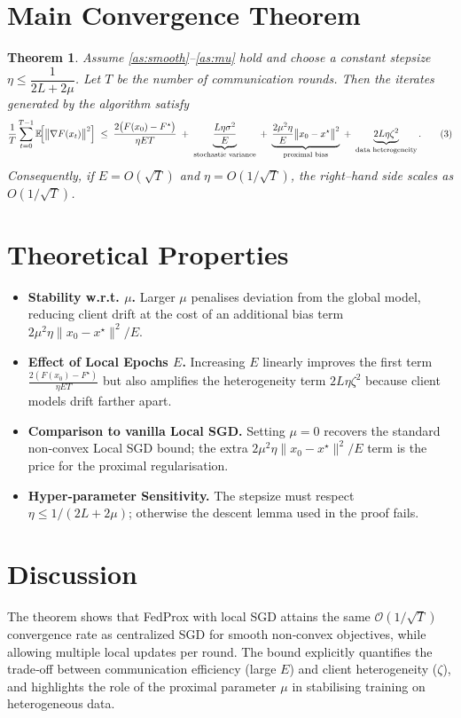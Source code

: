 \documentclass{article}
\newtheorem{theorem}{Theorem}
\newcommand{\E}{\mathbb{E}}
\begin{document}
\section*{Main Convergence Theorem}
\begin{theorem}\label{thm:main}
Assume \ref{as:smooth}–\ref{as:mu} hold and choose a constant stepsize 
$\eta\le \dfrac{1}{2L+2\mu}$.  
Let $T$ be the number of communication rounds.  
Then the iterates generated by the algorithm satisfy
\[
\frac1T\sum_{t=0}^{T-1}
\E\!\Bigl[\bigl\|\nabla F(x_t)\bigr\|^{2}\Bigr]
\;\le\;
\frac{2\bigl(F(x_0)-F^{\star}\bigr)}{\eta ET}
\;+\;
\underbrace{ \frac{L\eta\sigma^{2}}{E} }_{\text{stochastic variance}}
\;+\;
\underbrace{ \frac{2\mu^{2}\eta}{E}\bigl\|x_0-x^{\star}\bigr\|^{2} }_{\text{proximal bias}}
\;+\;
\underbrace{ 2L\eta\zeta^{2} }_{\text{data heterogeneity}} .
\tag{3}
\]
Consequently, if $E=O(\sqrt{T})$ and $\eta=O(1/\sqrt{T})$, the right–hand side scales as $O(1/\sqrt{T})$.
\end{theorem}

\section*{Theoretical Properties}
\begin{itemize}
\item \textbf{Stability w.r.t. $\mu$.} Larger $\mu$ penalises deviation from the global model, reducing client drift at the cost of an additional bias term $2\mu^{2}\eta\|x_0-x^{\star}\|^{2}/E$.
\item \textbf{Effect of Local Epochs $E$.} Increasing $E$ linearly improves the first term $\frac{2(F(x_0)-F^{\star})}{\eta ET}$ but also amplifies the heterogeneity term $2L\eta\zeta^{2}$ because client models drift farther apart.
\item \textbf{Comparison to vanilla Local SGD.} Setting $\mu=0$ recovers the standard non‑convex Local SGD bound; the extra $2\mu^{2}\eta\|x_0-x^{\star}\|^{2}/E$ term is the price for the proximal regularisation.
\item \textbf{Hyper‑parameter Sensitivity.} The stepsize must respect $\eta\le 1/(2L+2\mu)$; otherwise the descent lemma used in the proof fails.
\end{itemize}

\section*{Discussion}
The theorem shows that FedProx with local SGD attains the same $\mathcal{O}(1/\sqrt{T})$ convergence rate as centralized SGD for smooth non‑convex objectives, while allowing multiple local updates per round. The bound explicitly quantifies the trade‑off between communication efficiency (large $E$) and client heterogeneity ($\zeta$), and highlights the role of the proximal parameter $\mu$ in stabilising training on heterogeneous data.
\end{document}
